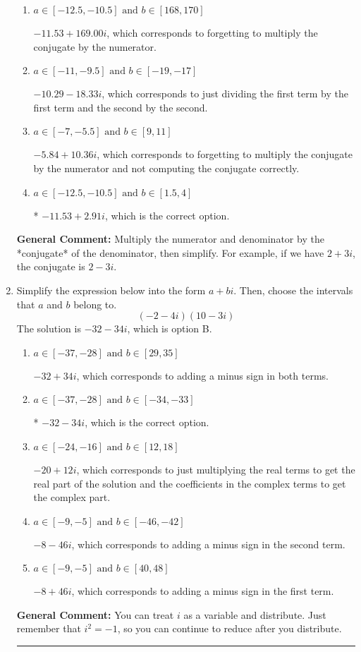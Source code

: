 \documentclass{extbook}[14pt]
\newcommand{\litem}[1]{\item #1

\rule{\textwidth}{0.4pt}}
\begin{document}
\begin{enumerate}
{\begin{enumerate}[label=\Alph*.]
 $-669.00  + 2.91 i$, which corresponds to forgetting to multiply the conjugate by the numerator and using a plus instead of a minus in the denominator.
\item \( a \in [-12.5, -10.5] \text{ and } b \in [168, 170] \)

 $-11.53  + 169.00 i$, which corresponds to forgetting to multiply the conjugate by the numerator.
\item \( a \in [-11, -9.5] \text{ and } b \in [-19, -17] \)

 $-10.29  - 18.33 i$, which corresponds to just dividing the first term by the first term and the second by the second.
\item \( a \in [-7, -5.5] \text{ and } b \in [9, 11] \)

 $-5.84  + 10.36 i$, which corresponds to forgetting to multiply the conjugate by the numerator and not computing the conjugate correctly.
\item \( a \in [-12.5, -10.5] \text{ and } b \in [1.5, 4] \)

* $-11.53  + 2.91 i$, which is the correct option.
\end{enumerate}

\textbf{General Comment:} Multiply the numerator and denominator by the *conjugate* of the denominator, then simplify. For example, if we have $2+3i$, the conjugate is $2-3i$.
}
\litem{
Simplify the expression below into the form $a+bi$. Then, choose the intervals that $a$ and $b$ belong to.
\[ (-2 - 4 i)(10 - 3 i) \]The solution is \( -32 - 34 i \), which is option B.\begin{enumerate}[label=\Alph*.]
\item \( a \in [-37, -28] \text{ and } b \in [29, 35] \)

 $-32 + 34 i$, which corresponds to adding a minus sign in both terms.
\item \( a \in [-37, -28] \text{ and } b \in [-34, -33] \)

* $-32 - 34 i$, which is the correct option.
\item \( a \in [-24, -16] \text{ and } b \in [12, 18] \)

 $-20 + 12 i$, which corresponds to just multiplying the real terms to get the real part of the solution and the coefficients in the complex terms to get the complex part.
\item \( a \in [-9, -5] \text{ and } b \in [-46, -42] \)

 $-8 - 46 i$, which corresponds to adding a minus sign in the second term.
\item \( a \in [-9, -5] \text{ and } b \in [40, 48] \)

 $-8 + 46 i$, which corresponds to adding a minus sign in the first term.
\end{enumerate}

\textbf{General Comment:} You can treat $i$ as a variable and distribute. Just remember that $i^2=-1$, so you can continue to reduce after you distribute.
}
\end{enumerate}
\end{document}
